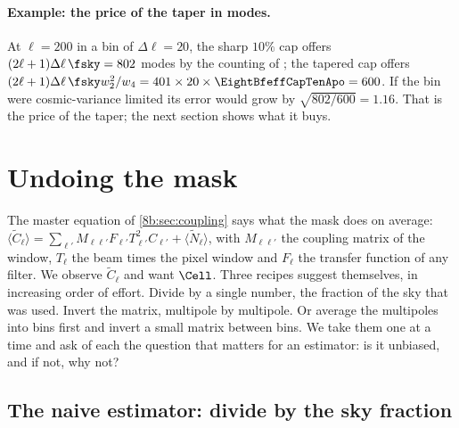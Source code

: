 \paragraph{Example: the price of the taper in modes.}
At $\ell=200$ in a bin of $\Delta\ell=20$, the sharp $10\%$ cap offers $(2\ell+1)\Delta\ell\,\fsky=802$ modes by
the counting of ; the tapered cap offers
$(2\ell+1)\Delta\ell\,\fsky w_2^2/w_4=401\times20\times\EightBfeffCapTenApo=600$. If the bin were cosmic-variance
limited its error would grow by $\sqrt{802/600}=1.16$. That is the price of the taper; the next
section shows what it buys.
\section{Undoing the mask}
\label{8b:sec:master}

The master equation of \cref{8b:sec:coupling} says what the mask does on average:
$\langle\widetilde C_\ell\rangle=\sum_{\ell'}M_{\ell\ell'}F_{\ell'}T_{\ell'}^2C_{\ell'}+\langle\widetilde N_\ell\rangle$, with
$M_{\ell\ell'}$ the coupling matrix of the window, $T_\ell$ the beam times the pixel window and $F_\ell$
the transfer function of any filter. We observe $\widetilde C_\ell$ and want $\Cell$. Three recipes
suggest themselves, in increasing order of effort. Divide by a single number, the fraction of the
sky that was used. Invert the matrix, multipole by multipole. Or average the multipoles into
bins first and invert a small matrix between bins. We take them one at a time and ask of each
the question that matters for an estimator: is it unbiased, and if not, why not?

\subsection{The naive estimator: divide by the sky fraction}
\label{8b:sec:naive}

